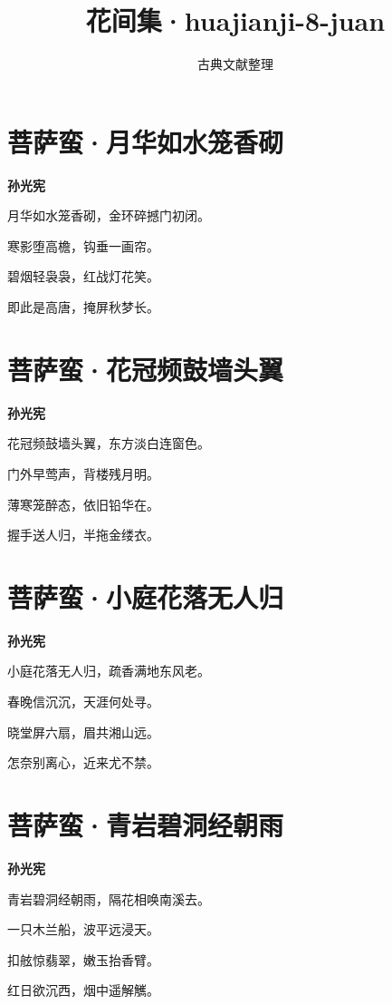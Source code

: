 \documentclass[12pt,a4paper]{ctexbook}
\title{花间集·huajianji-8-juan}
\author{古典文献整理}
\date{}
\begin{document}
\maketitle
\tableofcontents
\newpage
\section{菩萨蛮·月华如水笼香砌}
\textbf{孙光宪}\par\vspace{0.5em}
月华如水笼香砌，金环碎撼门初闭。\par
寒影堕高檐，钩垂一画帘。\par
碧烟轻袅袅，红战灯花笑。\par
即此是高唐，掩屏秋梦长。\par

\section{菩萨蛮·花冠频鼓墙头翼}
\textbf{孙光宪}\par\vspace{0.5em}
花冠频鼓墙头翼，东方淡白连窗色。\par
门外早莺声，背楼残月明。\par
薄寒笼醉态，依旧铅华在。\par
握手送人归，半拖金缕衣。\par

\section{菩萨蛮·小庭花落无人归}
\textbf{孙光宪}\par\vspace{0.5em}
小庭花落无人归，疏香满地东风老。\par
春晚信沉沉，天涯何处寻。\par
晓堂屏六扇，眉共湘山远。\par
怎奈别离心，近来尤不禁。\par

\section{菩萨蛮·青岩碧洞经朝雨}
\textbf{孙光宪}\par\vspace{0.5em}
青岩碧洞经朝雨，隔花相唤南溪去。\par
一只木兰船，波平远浸天。\par
扣舷惊翡翠，嫩玉抬香臂。\par
红日欲沉西，烟中遥解觽。\par
\end{document}
